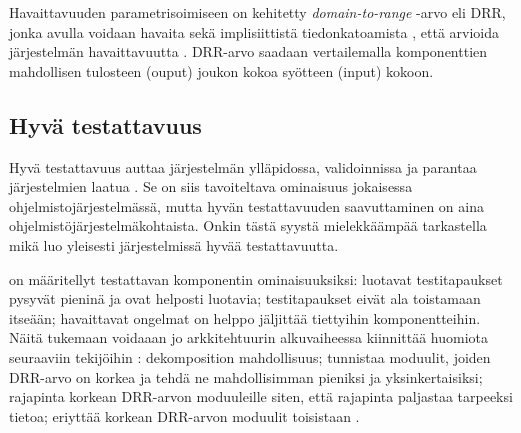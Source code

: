 \documentclass[finnish]{tktltiki2}
\theoremstyle{definition}
\theoremstyle{remark}
\begin{document}

Havaittavuuden parametrisoimiseen on kehitetty \textit{domain-to-range} -arvo eli DRR, jonka avulla voidaan havaita sekä implisiittistä tiedonkatoamista \citep[s. 20-22]{Voas:1995:STN:624607.625469}, että arvioida järjestelmän havaittavuutta \citep[s. 1]{Jungmayr:2002}. DRR-arvo saadaan vertailemalla komponenttien mahdollisen tulosteen (ouput) joukon kokoa syötteen (input) kokoon.  



\subsection{Hyvä testattavuus}


Hyvä testattavuus auttaa järjestelmän ylläpidossa, validoinnissa ja parantaa järjestelmien laatua \citep[s. 20]{Voas:1995:STN:624607.625469}. Se on siis tavoiteltava ominaisuus jokaisessa ohjelmistojärjestelmässä, mutta hyvän testattavuuden saavuttaminen on aina ohjelmistöjärjestelmäkohtaista. Onkin tästä syystä mielekkäämpää tarkastella mikä luo yleisesti järjestelmissä hyvää testattavuutta. 





\citep[s. 554]{Freedman:1991:TSC:126218.126229} on määritellyt testattavan komponentin ominaisuuksiksi: luotavat testitapaukset pysyvät pieninä ja ovat helposti luotavia; testitapaukset eivät ala toistamaan itseään; havaittavat ongelmat on helppo jäljittää tiettyihin komponentteihin. Näitä tukemaan voidaaan jo arkkitehtuurin alkuvaiheessa kiinnittää huomiota seuraaviin tekijöihin \citep[s. 117]{voas_improving_1992}: dekomposition mahdollisuus; tunnistaa moduulit, joiden DRR-arvo on korkea ja tehdä ne mahdollisimman pieniksi ja yksinkertaisiksi; rajapinta korkean DRR-arvon moduuleille siten, että rajapinta paljastaa tarpeeksi tietoa; eriyttää korkean DRR-arvon moduulit toisistaan \citep[s. 23]{Voas:1995:STN:624607.625469}. 
\end{document}
